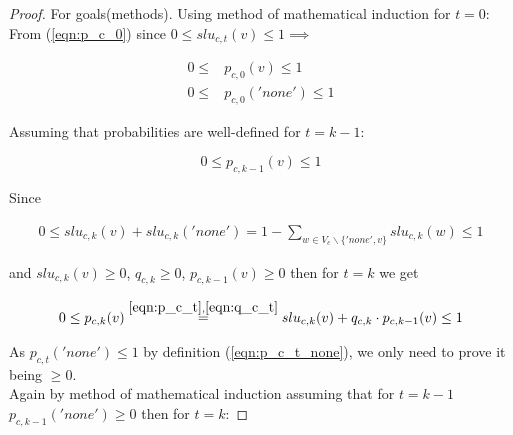 \documentclass[12pt,titlepage,a4paper]{article}
\begin{document}
\begin{proof}
    For goals(methods).
    Using method of mathematical induction for $t=0$: \\
    From (\ref{eqn:p_c_0}) since $0 \leq slu_{c,t}(v) \leq 1 \implies $

    \begin{equation}
        \begin{aligned}
            0 \leq &p_{c,0}(v) \leq 1 \\
            0 \leq &p_{c, 0}('none') \leq 1
        \end{aligned}
    \end{equation}

    \noindent Assuming that probabilities are well-defined for $t = k-1$:

    \begin{equation}
        0 \leq p_{c,k-1}(v) \leq 1
    \end{equation} 

    \noindent Since

    \begin{equation}
        \begin{aligned}
            0 \leq slu_{c,k}(v) + slu_{c,k}('none') = 1 - \sum_{w \in V_{c} \backslash \{'none', v\}} slu_{c,k}(w) \leq 1
        \end{aligned}
    \end{equation}

    \noindent and $ slu_{c,k}(v) \geq 0 $,  $q_{c,k} \geq 0$, $p_{c,k-1}(v) \geq 0$
    then for $t=k$ we get

    \begin{equation}
        \begin{aligned}
            0 \leq p_{c, k}(v) \overset{
                \mathrm{\ref{eqn:p_c_t}}, 
                \mathrm{\ref{eqn:q_c_t}}
                }{=} slu_{c,k}(v) + q_{c,k} \cdot p_{c, k-1}(v) \leq 1
        \end{aligned}
    \end{equation}

    \noindent As $p_{c, t}('none') \leq 1$ by definition (\ref{eqn:p_c_t_none}), we only need to prove it being $\geq 0$.\\
    
    \noindent Again by method of mathematical induction assuming that for $t = k-1$ $p_{c, k-1}('none') \geq 0$ then for $t = k$:


\end{proof}
\end{document}
